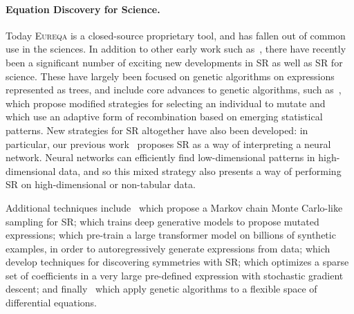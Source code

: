 \documentclass[letterpaper,twocolumn]{scrartcl}
\newcommand\eureqa{\textsc{Eureqa}\xspace}
\begin{document}
\begin{linenumbers}
\paragraph{Equation Discovery for Science.} 
Today \eureqa is a closed-source proprietary tool, and has fallen out of common use in the sciences.
In addition to other early work such as~\cite{debFastElitistNondominated2000,debFastElitistMultiobjective2002,davidsonSymbolicNumericalRegression2003,cranmerPhysicsGPGeneticProgramming2005},
there have recently been a significant number of exciting new developments in SR as well as SR for science.
These have largely been focused on genetic algorithms on expressions represented as trees, and include core advances to genetic algorithms, such as~\cite{lacavaEpsilonLexicaseSelectionRegression2016,lacavaProbabilisticMultiobjectiveAnalysis2018}, which propose modified strategies for selecting an individual to mutate and~\cite{virgolinScalableGeneticProgramming2017,virgolinImprovingModelbasedGenetic2021} which use an adaptive form of recombination based on emerging statistical patterns.
New strategies for SR altogether have also been developed:
in particular, our previous work~\cite{cranmerLearningSymbolicPhysics2019,cranmerDiscoveringSymbolicModels2020,cranmerDisentangledSparsityNetworks2021} proposes SR as a way of interpreting a neural network.
Neural networks can efficiently find low-dimensional patterns in high-dimensional data, and so this mixed strategy also presents a way of performing SR on high-dimensional or non-tabular data.

Additional techniques include~\cite{jinBayesianSymbolicRegression2020,guimeraBayesianMachineScientist2020} which propose a Markov chain Monte Carlo-like sampling for SR;
\cite{petersenDeepSymbolicRegression2021,liNeuralguidedSymbolicRegression2019} which trains deep generative models to propose mutated expressions;
\cite{dascoliDeepSymbolicRegression2022,kamiennyEndtoendSymbolicRegression2022} which pre-train a large transformer model on billions of synthetic examples, in order to autoregressively generate expressions from data;
\cite{udrescuAIFeynmanParetooptimal2020,liuAIPoincareMachine2020,wetzelDiscoveringSymmetryInvariants2020} which develop techniques for discovering symmetries with SR;
\cite{sahooLearningEquationsExtrapolation2018} which optimizes a sparse set of coefficients in a very large pre-defined expression with stochastic gradient descent; and finally~\cite{atkinsonDatadrivenDiscoveryFreeform2019,rossBenchmarkingMachineLearning2022} which apply genetic algorithms to a flexible space of differential equations.


\end{linenumbers}
\end{document}
